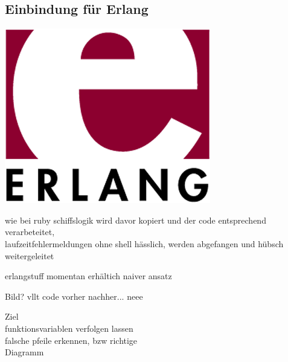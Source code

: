 \subsection{Einbindung für Erlang}

\begin{frame}
\begin{center}
\includegraphics[scale=0.6]{erlang/pics/erlang.png}
\end{center}
\end{frame}

\begin{frame}
wie bei ruby schiffslogik wird davor kopiert
und der code entsprechend verarbeteitet, \\
laufzeitfehlermeldungen ohne shell hässlich, werden abgefangen und hübsch weitergeleitet
\end{frame}

\begin{frame}
erlangstuff momentan erhältich
naiver ansatz 

Bild? vllt code
vorher nachher... neee
\end{frame}

\begin{frame}
Ziel\\
funktionsvariablen verfolgen lassen\\
falsche pfeile erkennen, bzw richtige\\
Diagramm
\end{frame}

